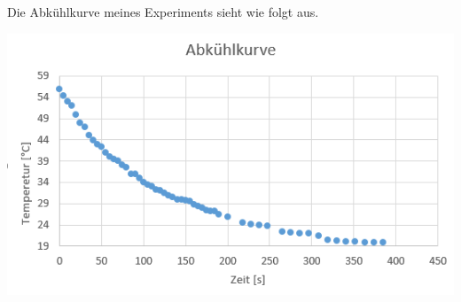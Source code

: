 \documentclass{article}
\begin{document}
\newpage
Die Abkühlkurve meines Experiments sieht wie folgt aus. 
\begin{center}
	\includegraphics[scale=0.6]{Graph1.png}
\end{center}
\end{document}
